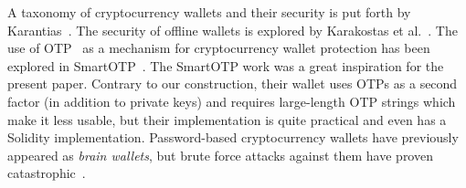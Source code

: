 A taxonomy of cryptocurrency wallets and their security is put forth by Karantias~\cite{wallet-taxonomy}.
The security of offline wallets is explored by Karakostas et al.~\cite{hardware-wallets}.
The use of OTP~\cite{rfc6238,rfc4226} as a mechanism for cryptocurrency wallet protection has been explored in SmartOTP~\cite{smartotp}.
The SmartOTP work was a great inspiration for the present paper. Contrary to our construction, their
wallet uses OTPs as a second factor (in addition to private keys) and requires large-length OTP strings
which make it less usable, but their implementation is quite practical and even has a Solidity implementation.
Password-based cryptocurrency wallets have previously appeared as \emph{brain wallets},
but brute force attacks against them have proven catastrophic~\cite{brain-drain}.
